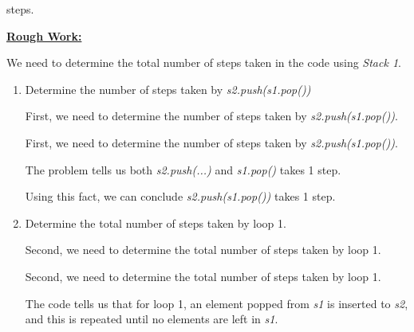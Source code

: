 \documentclass[12pt]{article}
\begin{document}
\begin{enumerate}[a.]
    steps.

    \bigskip

    \begin{mdframed}
        \underline{\textbf{Rough Work:}}

        \bigskip

        We need to determine the total number of steps taken in the code using \textit{Stack 1}.

        \bigskip

        \begin{enumerate}[1.]
            \item Determine the number of steps taken by \textit{s2.push(s1.pop())}

            \bigskip

            First, we need to determine the number of steps taken by \textit{s2.push(s1.pop())}.

            \bigskip

            \begin{mdframed}

            First, we need to determine the number of steps taken by \textit{s2.push(s1.pop())}.

            \bigskip

            The problem tells us both \textit{s2.push(...)} and \textit{s1.pop()} takes 1 step.

            \bigskip

            Using this fact, we can conclude \textit{s2.push(s1.pop())} takes 1 step.

            \end{mdframed}

            \item Determine the total number of steps taken by loop 1.

            \bigskip

            Second, we need to determine the total number of steps taken by loop 1.

            \bigskip

            \begin{mdframed}
            Second, we need to determine the total number of steps taken by loop 1.

            \bigskip

            The code tells us that for loop 1, an element popped from \textit{s1} is inserted to \textit{s2},
            and this is repeated until no elements are left in \textit{s1}.


\end{mdframed}
\end{enumerate}
\end{mdframed}
\end{enumerate}
\end{document}
